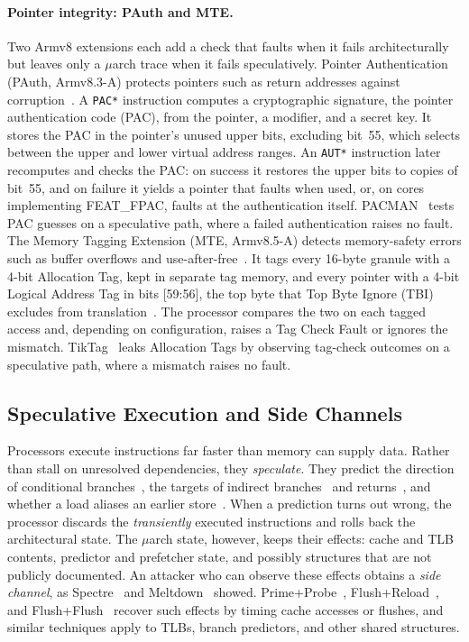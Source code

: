 \documentclass[letterpaper,twocolumn,10pt]{article}
\makeatletter
\theoremstyle{definition}
\def\uarch@bold#1#2\@nil{\if b#1\boldmath\fi}
\DeclareRobustCommand{\uarch}{{\expandafter\uarch@bold\f@series\@nil\ensuremath{\mu}}arch\xspace}
\makeatother
\begin{document}
\paragraph{Pointer integrity: PAuth and MTE.}
Two Armv8 extensions each add a check that faults when it fails architecturally but leaves
only a \uarch trace when it fails speculatively. Pointer Authentication (PAuth, Armv8.3-A)
protects pointers such as return addresses against corruption~\cite{arm_pac,pac_whitepaper}. A
\texttt{PAC*} instruction computes a cryptographic signature, the pointer authentication code
(PAC), from the pointer, a modifier, and a secret key. It stores the PAC in the pointer's
unused upper bits, excluding bit~55, which selects between the upper and lower virtual address
ranges. An \texttt{AUT*} instruction later recomputes and checks the PAC: on success it
restores the upper bits to copies of bit~55, and on failure it yields a pointer that faults
when used, or, on cores implementing FEAT\_FPAC, faults at the authentication itself.
PACMAN~\cite{pacman} tests PAC guesses on a speculative path, where a failed authentication
raises no fault. The Memory Tagging Extension (MTE, Armv8.5-A) detects memory-safety errors
such as buffer overflows and use-after-free~\cite{arm_mte,mte_whitepaper}. It tags every
16-byte granule with a 4-bit Allocation Tag, kept in separate tag memory, and every pointer
with a 4-bit Logical Address Tag in bits [59:56], the top byte that Top Byte Ignore (TBI)
excludes from translation~\cite{arm_tbi}. The processor compares the two on each tagged access
and, depending on configuration, raises a Tag Check Fault or ignores the mismatch.
TikTag~\cite{tiktag} leaks Allocation Tags by observing tag-check outcomes on a speculative
path, where a mismatch raises no fault.

\subsection{Speculative Execution and Side Channels}
\label{sec:background-speculation}

Processors execute instructions far faster than memory can supply data. Rather than stall on
unresolved dependencies, they \emph{speculate}. They predict the direction of conditional
branches~\cite{tage}, the targets of indirect branches~\cite{seznec201164,lee1984branch} and
returns~\cite{kaeli1991branch}, and whether a load aliases an earlier store~\cite{chrysos1998memory}.
When a
prediction turns out wrong, the processor discards the \emph{transiently} executed
instructions and rolls back the architectural state. The \uarch state, however, keeps their
effects: cache and TLB contents, predictor and prefetcher state, and possibly structures that
are not publicly documented. An attacker who can observe these effects obtains a
\emph{side channel}, as Spectre~\cite{spectre} and Meltdown~\cite{meltdown} showed.
Prime+Probe~\cite{primeprobe}, Flush+Reload~\cite{flushreload}, and Flush+Flush~\cite{flushflush}
recover such effects by timing cache accesses or flushes, and similar techniques apply to TLBs,
branch predictors, and other shared structures.
\end{document}
